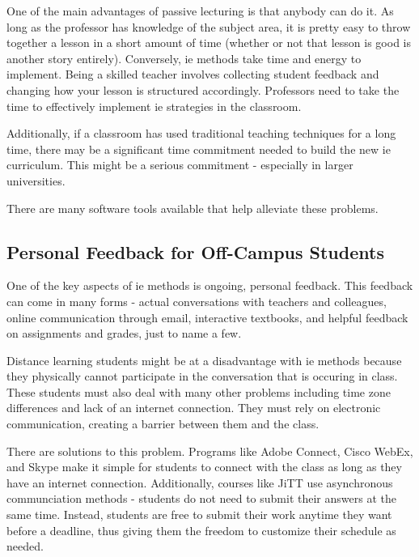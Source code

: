 One of the main advantages of passive lecturing is that anybody can do it. As long as the professor has knowledge of the subject area, it is pretty easy to throw together a lesson in a short amount of time (whether or not that lesson is good is another story entirely). Conversely, \gls{ie} methods take time and energy to implement. Being a skilled teacher involves collecting student feedback and changing how your lesson is structured accordingly. Professors need to take the time to effectively implement \gls{ie} strategies in the classroom.

Additionally, if a classroom has used traditional teaching techniques for a long time, there may be a significant time commitment needed to build the new \gls{ie} curriculum. This might be a serious commitment - especially in larger universities.

There are many software tools available that help alleviate these problems.

\subsection{Personal Feedback for Off-Campus Students}

One of the key aspects of \gls{ie} methods is ongoing, personal feedback. This feedback can come in many forms - actual conversations with teachers and colleagues, online communication through email, interactive textbooks, and helpful feedback on assignments and grades, just to name a few.

Distance learning students might be at a disadvantage with \gls{ie} methods because they physically cannot participate in the conversation that is occuring in class. These students must also deal with many other problems including time zone differences and lack of an internet connection. They must rely on electronic communication, creating a barrier between them and the class.

There are solutions to this problem. Programs like Adobe Connect, Cisco WebEx, and Skype make it simple for students to connect with the class as long as they have an internet connection. Additionally, courses like JiTT use asynchronous communciation methods - students do not need to submit their answers at the same time. Instead, students are free to submit their work anytime they want before a deadline, thus giving them the freedom to customize their schedule as needed.


